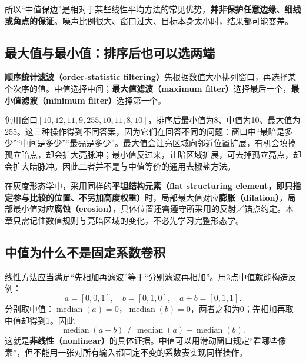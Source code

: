 \begin{center}
\end{center}
所以“中值保边”是相对于某些线性平均方法的常见优势，\textbf{并非保护任意边缘、细线或角点的保证}。噪声比例很大、窗口过大、目标本身太小时，结果都可能变差。

\subsection{最大值与最小值：排序后也可以选两端}
\textbf{顺序统计滤波（order-statistic filtering）}先根据数值大小排列窗口，再选择某个次序的值。中值选择中间；\textbf{最大值滤波（maximum filter）}选择最后一个，\textbf{最小值滤波（minimum filter）}选择第一个。

仍用窗口$[10,12,11,9,255,10,11,8,10]$，排序后最小值为8、中值为10、最大值为255。这三种操作得到不同答案，因为它们在回答不同的问题：窗口中“最暗是多少”“中间是多少”“最亮是多少”。最大值会让亮区域向邻近位置扩展，有机会填掉孤立暗点，却会扩大亮脉冲；最小值反过来，让暗区域扩展，可去掉孤立亮点，却会扩大暗脉冲。因此二者并不是与中值等价的通用去椒盐方法。

在灰度形态学中，采用同样的\textbf{平坦结构元素（flat structuring element，即只指定参与比较的位置、不另加高度权重）}时，局部最大值对应\textbf{膨胀（dilation）}，局部最小值对应\textbf{腐蚀（erosion）}，具体位置还需遵守所采用的反射／锚点约定。本章只需记住数值规则与亮暗区域的变化，不必先学习完整形态学。

\subsection{中值为什么不是固定系数卷积}
线性方法应当满足“先相加再滤波”等于“分别滤波再相加”。用3点中值就能构造反例：
\[
 a=[0,0,1],\quad b=[0,1,0],\quad a+b=[0,1,1].
\]
分别取中值：$\operatorname{median}(a)=0$，$\operatorname{median}(b)=0$，两者之和为0；先相加再取中值却得到1。因此
\[
 \operatorname{median}(a+b)\ne\operatorname{median}(a)+\operatorname{median}(b).
\]
这就是\textbf{非线性（nonlinear）}的具体证据。中值可以用滑动窗口规定“看哪些像素”，但不能用一张对所有输入都固定不变的系数表实现同样操作。

